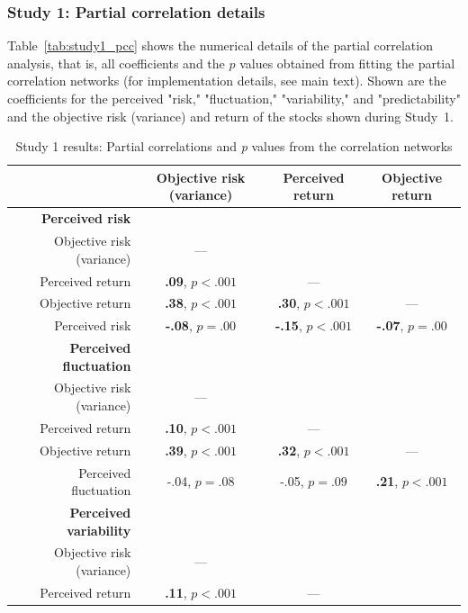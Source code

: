 \subsubsection{Study 1: Partial correlation details}
Table~\ref{tab:study1_pcc} shows the numerical details of the partial correlation analysis, that is, all coefficients and the $p$ values obtained from fitting the partial correlation networks (for implementation details, see main text). Shown are the coefficients for the perceived "risk," "fluctuation," "variability," and "predictability" and the objective risk (variance) and return of the stocks shown during Study~1.

\begin{table}[H]
\begin{center}
\begin{threeparttable}
\caption{\label{tab:study1_pcc}Study 1 results: Partial correlations and \textit{p} values from the correlation networks
\label{study1_pcc}}
\begin{tabular}{rccc}
\toprule
 & \multicolumn{1}{c}{Objective risk (variance)} & \multicolumn{1}{c}{Perceived return} & \multicolumn{1}{c}{Objective return}\\
\midrule
\cmidrule{2-4} \textbf{ Perceived risk } &  &  & \\
\ \ \ Objective risk (variance) & --- &  & \\
\ \ \ Perceived return & \textbf{.09}, $p<.001$ & --- & \\
\ \ \ Objective return & \textbf{.38}, $p<.001$ & \textbf{.30}, $p<.001$ & ---\\
\ \ \ Perceived risk & \textbf{-.08}, $ p= .00 $ & \textbf{-.15}, $p<.001$ & \textbf{-.07}, $ p= .00 $\\
\cmidrule{2-4} \textbf{ Perceived fluctuation } &  &  & \\
\ \ \ Objective risk (variance) & --- &  & \\
\ \ \ Perceived return & \textbf{.10}, $p<.001$ & --- & \\
\ \ \ Objective return & \textbf{.39}, $p<.001$ & \textbf{.32}, $p<.001$ & ---\\
\ \ \ Perceived fluctuation & -.04, $ p= .08 $ & -.05, $ p= .09 $ & \textbf{.21}, $p<.001$\\
\cmidrule{2-4} \textbf{ Perceived variability } &  &  & \\
\ \ \ Objective risk (variance) & --- &  & \\
\ \ \ Perceived return & \textbf{.11}, $p<.001$ & --- & \\

\end{tabular}
\end{threeparttable}
\end{center}
\end{table}
